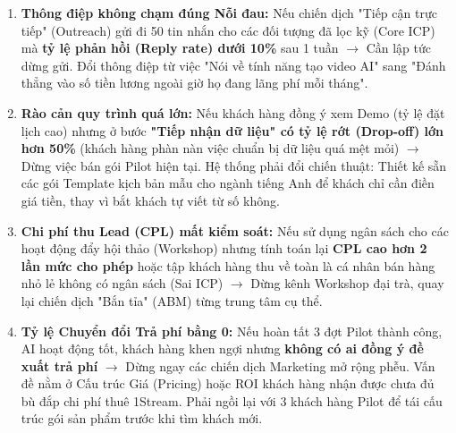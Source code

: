 \begin{enumerate}
    \item \textbf{Thông điệp không chạm đúng Nỗi đau:} Nếu chiến dịch "Tiếp cận trực tiếp" (Outreach) gửi đi 50 tin nhắn cho các đối tượng đã lọc kỹ (Core ICP) mà \textbf{tỷ lệ phản hồi (Reply rate) dưới 10\%} sau 1 tuần $\rightarrow$ Cần lập tức dừng gửi. Đổi thông điệp từ việc "Nói về tính năng tạo video AI" sang "Đánh thẳng vào số tiền lương ngoài giờ họ đang lãng phí mỗi tháng".
    \item \textbf{Rào cản quy trình quá lớn:} Nếu khách hàng đồng ý xem Demo (tỷ lệ đặt lịch cao) nhưng ở bước \textbf{"Tiếp nhận dữ liệu" có tỷ lệ rớt (Drop-off) lớn hơn 50\%} (khách hàng phàn nàn việc chuẩn bị dữ liệu quá mệt mỏi) $\rightarrow$ Dừng việc bán gói Pilot hiện tại. Hệ thống phải đổi chiến thuật: Thiết kế sẵn các gói Template kịch bản mẫu cho ngành tiếng Anh để khách chỉ cần điền giá tiền, thay vì bắt khách tự viết từ số không.
    \item \textbf{Chi phí thu Lead (CPL) mất kiểm soát:} Nếu sử dụng ngân sách cho các hoạt động đẩy hội thảo (Workshop) nhưng tính toán lại \textbf{CPL cao hơn 2 lần mức cho phép} hoặc tập khách hàng thu về toàn là cá nhân bán hàng nhỏ lẻ không có ngân sách (Sai ICP) $\rightarrow$ Dừng kênh Workshop đại trà, quay lại chiến dịch "Bắn tỉa" (ABM) từng trung tâm cụ thể.
    \item \textbf{Tỷ lệ Chuyển đổi Trả phí bằng 0:} Nếu hoàn tất 3 đợt Pilot thành công, AI hoạt động tốt, khách hàng khen ngợi nhưng \textbf{không có ai đồng ý đề xuất trả phí} $\rightarrow$ Dừng ngay các chiến dịch Marketing mở rộng phễu. Vấn đề nằm ở Cấu trúc Giá (Pricing) hoặc ROI khách hàng nhận được chưa đủ bù đắp chi phí thuê 1Stream. Phải ngồi lại với 3 khách hàng Pilot để tái cấu trúc gói sản phẩm trước khi tìm khách mới.
\end{enumerate}